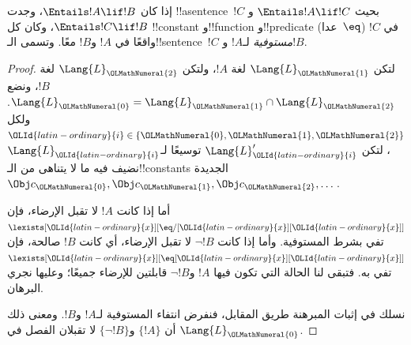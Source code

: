 \documentclass[../../../include/open-logic-section]{subfiles}
\begin{document}


\begin{thm}
إذا كان $\Entails !A \lif !B$، وجدت !!a{sentence}~$!C$ بحيث
$\Entails !A \lif !C$ و$\Entails !C \lif !B$، وكان كل !!{constant}
و!!{function} و!!{predicate} (عدا~$\eq$) في $!C$ واقعًا في $!A$ و$!B$
معًا. وتسمى الـ!!{sentence}~$!C$ \emph{مستوفية} لـ$!A$ و$!B$.
\end{thm}

\begin{proof}
لتكن $\Lang{L}_\OLMathNumeral{1}$ لغة $!A$، ولتكن $\Lang{L}_\OLMathNumeral{2}$ لغة $!B$، ونضع
$\Lang{L}_\OLMathNumeral{0} = \Lang{L}_\OLMathNumeral{1} \cap \Lang{L}_\OLMathNumeral{2}$. ولكل
$\OLId{latin-ordinary}{i} \in \{\OLMathNumeral{0},\OLMathNumeral{1},\OLMathNumeral{2}\}$، لتكن $\Lang{L}'_\OLId{latin-ordinary}{i}$ توسيعًا لـ$\Lang{L}_\OLId{latin-ordinary}{i}$ نضيف فيه
ما لا يتناهى من الـ!!{constant}s الجديدة
$\Obj c_\OLMathNumeral{0}, \Obj c_\OLMathNumeral{1}, \Obj c_\OLMathNumeral{2}, \dots$.

أما إذا كانت $!A$ لا تقبل الإرضاء، فإن
$\lexists[\OLId{latin-ordinary}{x}][\eq/[\OLId{latin-ordinary}{x}][\OLId{latin-ordinary}{x}]]$ تفي بشرط المستوفية. وأما إذا كانت $\lnot !B$ لا تقبل
الإرضاء، أي كانت $!B$ صالحة، فإن
$\lexists[\OLId{latin-ordinary}{x}][\eq[\OLId{latin-ordinary}{x}][\OLId{latin-ordinary}{x}]]$ تفي به. فتبقى لنا الحالة التي تكون فيها $!A$
و$\lnot !B$ قابلتين للإرضاء جميعًا؛ وعليها نجري البرهان.

نسلك في إثبات المبرهنة طريق المقابل، فنفرض انتفاء المستوفية لـ$!A$
و$!B$. ومعنى ذلك أن $\{!A\}$ و$\{\lnot !B\}$ لا تقبلان
الفصل في $\Lang{L}_\OLMathNumeral{0}$.


\end{proof}
\end{document}
